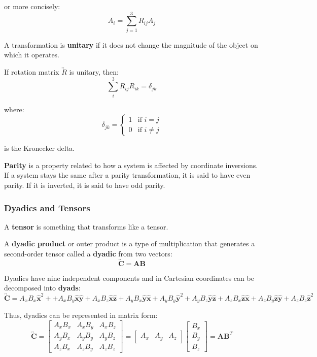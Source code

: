 \documentclass{article}
\begin{document}
or more concisely:
\[
    \bar{A_i}=\sum_{j=1}^3 R_{ij}A_j 
\]

\begin{definition}
    A transformation is \textbf{unitary} if it does not change the magnitude of the object on which it operates.
\end{definition}

If rotation matrix \(\overleftrightarrow{R}\) is unitary, then:
\[
    \sum_i^3R_{ij}R_{ik}=\delta_{jk}
\]

where:
\[
    \delta_{jk}=\begin{cases} 1 & \text{if } i=j \\ 0 & \text{if } i\neq j \end{cases}
\]

is the Kronecker delta.

\begin{definition}
    \textbf{Parity} is a property related to how a system is affected by coordinate inversions. If a system stays the same after a parity transformation, 
    it is said to have even parity. If it is inverted, it is said to have odd parity.
\end{definition}

\subsubsection{Dyadics and Tensors}
\begin{definition}
    A \textbf{tensor} is something that transforms like a tensor.
\end{definition}

\begin{definition}
    A \textbf{dyadic product} or outer product is a type of multiplication that generates a second-order tensor called a \textbf{dyadic} from two vectors:
    \[
        \overleftrightarrow{\mathbf{C}}=\mathbf{A} \mathbf{B} 
    \]
\end{definition}

Dyadics have nine independent components and in Cartesian coordinates can be decomposed into \textbf{dyads}:
\[
   \overleftrightarrow{\mathbf{C}} =A_xB_x \mathbf{\hat{x}}^2++A_xB_y \mathbf{\hat{x}} \mathbf{\hat{y}} +A_xB_z \mathbf{\hat{x}} \mathbf{\hat{z}} +A_yB_x \mathbf{\hat{y}} \mathbf{\hat{x}} +A_yB_y \mathbf{\hat{y}} ^2+A_yB_z \mathbf{\hat{y}} \mathbf{\hat{z}} +A_zB_x \mathbf{\hat{z}} \mathbf{\hat{x}} +A_zB_y \mathbf{\hat{z}} \mathbf{\hat{y}} +A_zB_z \mathbf{\hat{z}} ^2
\]

Thus, dyadics can be represented in matrix form:
\[
   \overleftrightarrow{\mathbf{C}} =\begin{bmatrix} A_xB_x & A_xB_y & A_xB_z \\ A_yB_x & A_yB_y & A_yB_z \\ A_zB_x & A_zB_y & A_zB_z \end{bmatrix}=\begin{bmatrix} A_x & A_y & A_z \end{bmatrix} \begin{bmatrix} B_x \\ B_y \\ B_z \end{bmatrix}=\mathbf{A} \mathbf{B} ^T
\]
\end{document}
